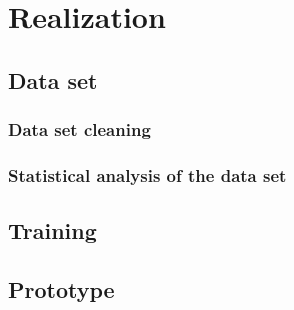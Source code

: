 \chapter{Realization}
\label{ch:Realization}

\section{Data set}
\label{sec:Data-Set}

\subsection{Data set cleaning}
\label{sub:Data-Set-Cleaning}

\subsection{Statistical analysis of the data set}
\label{sub:Statistical-Analysis-Data-Set}

\section{Training}
\label{sec:Training}

\section{Prototype}
\label{sec:Prototype}
